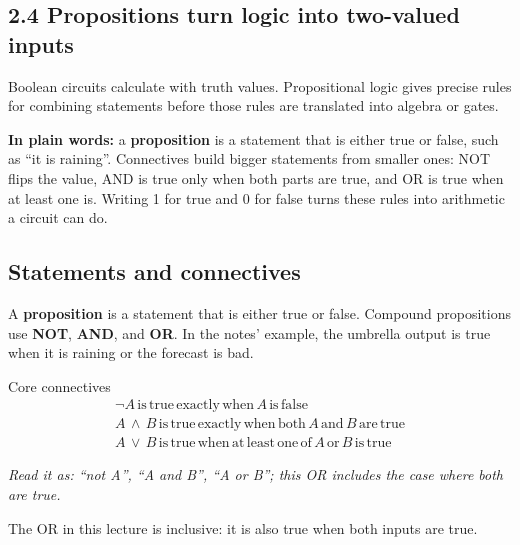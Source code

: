 \documentclass[11pt]{article}
\begin{document}
\begin{keepsection}
\section{2.4 Propositions turn logic into two-valued inputs}

Boolean circuits calculate with truth values. Propositional logic gives precise rules for combining statements before those rules are translated into algebra or gates.

\begin{plainbox}\textbf{In plain words:} a \textbf{proposition} is a statement that is either true or false, such as “it is raining”. Connectives build bigger statements from smaller ones: NOT flips the value, AND is true only when both parts are true, and OR is true when at least one is. Writing 1 for true and 0 for false turns these rules into arithmetic a circuit can do.\end{plainbox}

\begin{keepsection}
\subsection{Statements and connectives}

A \textbf{proposition} is a statement that is either true or false. Compound propositions use \textbf{NOT}, \textbf{AND}, and \textbf{OR}. In the notes' example, the umbrella output is true when it is raining or the forecast is bad.

\begin{equationcard}{Core connectives}
\[ \begin{gathered} \neg {A}\, \text{is}\, \text{true}\, \text{exactly}\, \text{when}\, {A}\, \text{is}\, \text{false} \\ {A}\, \land \, {B}\, \text{is}\, \text{true}\, \text{exactly}\, \text{when}\, \text{both}\, {A}\, \text{and}\, {B}\, \text{are}\, \text{true} \\ {A}\, \lor \, {B}\, \text{is}\, \text{true}\, \text{when}\, \text{at}\, \text{least}\, \text{one}\, \text{of}\, {A}\, \text{or}\, {B}\, \text{is}\, \text{true} \end{gathered} \]
{\small \emph{Read it as: “not A”, “A and B”, “A or B”; this OR includes the case where both are true.}\par The OR in this lecture is inclusive: it is also true when both inputs are true.}
\end{equationcard}


\end{keepsection}
\end{keepsection}
\end{document}

